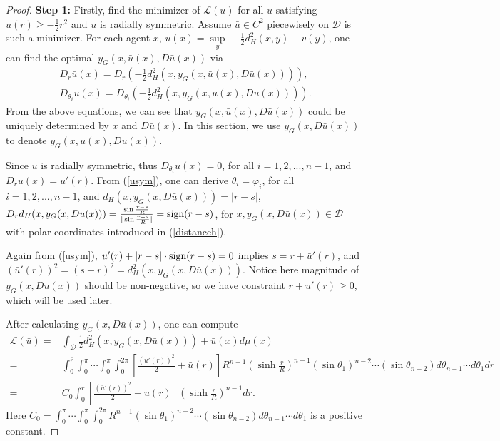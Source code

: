 \begin{proof}
	{\bf Step 1:} Firstly, find the minimizer of $\mathcal{L}(u)$ for all $u$ satisfying $u(r)\ge -\frac{1}{2}r^2$ and $u$ is radially symmetric. Assume $\bar{u} \in C^2$ piecewisely on $\mathcal{D}$ is such a minimizer. For each agent $x$, $\bar{u}(x)= \sup\limits_{y} -\frac{1}{2}d_H^2(x,y)-v(y)$, one can find the optimal $y_G(x, \bar{u}(x), D\bar{u}(x))$ via
	\begin{equation}\label{usym}
	\begin{split}
	D_r\bar{u}(x) = D_r\left(-\frac{1}{2} d_H^2(x, y_G(x, \bar{u}(x), D\bar{u}(x)))\right),\\
	D_{\theta_i}\bar{u}(x) = D_{\theta_i}\left(-\frac{1}{2} d_H^2(x, y_G(x, \bar{u}(x), D\bar{u}(x)))\right).
	\end{split}
	\end{equation}
	From the above equations, we can see that $y_G(x, \bar{u}(x), D\bar{u}(x))$ could be uniquely determined by $x$ and $D\bar{u}(x)$. In this section, we use $y_G(x, D\bar{u}(x))$ to denote $y_G(x, \bar{u}(x), D\bar{u}(x))$.
	
	Since $\bar{u}$ is radially symmetric, thus $D_{\theta_i} \bar{u}(x) =0 $, for all $i=1,2,...,n-1$, and $D_r\bar{u}(x)= \bar{u}'(r)$. From (\ref{usym}), one can derive $\theta_i = \varphi_i$, for all $i=1,2,...,n-1$, and $d_H(x, y_G(x, D\bar{u}(x))) = |r-s|$, $D_rd_H(x,y_G(x, D\bar{u}(x)))=\frac{\sin\frac{r-s}{R}}{|\sin\frac{r-s}{R}|}= \textrm{sign}(r-s) $, for $x, y_G(x, D\bar{u}(x)) \in \mathcal{D}$ with polar coordinates introduced in (\ref{distanceh}).
	
	 Again from (\ref{usym}), $\bar{u}'(r)+|r-s|\cdot \textrm{sign}(r-s)=0$ implies $s=r+\bar{u}'(r)$, and $(\bar{u}'(r))^2 =(s-r)^2 = d_H^2(x, y_G(x, D\bar{u}(x)))$. Notice here magnitude of $y_G(x, D\bar{u}(x))$ should be non-negative, so we have constraint $r+\bar{u}'(r) \ge 0$, which will be used later.
	 
	After calculating $y_G(x, D\bar{u}(x))$, one can compute
	\begin{equation*}
	\begin{split}
	\mathcal{L}(\bar{u})=& \int_{\mathcal{D}} \frac{1}{2} d_H^2(x,y_G(x, D\bar{u}(x)))+\bar{u}(x) d\mu(x)\\
	=&\int_{0}^{\bar{r}}\int_{0}^{\pi}\cdots\int_{0}^{\pi}\int_{0}^{2\pi}\left[\frac{(\bar{u}'(r))^2}{2}+\bar{u}(r)\right]R^{n-1}\left(\sinh\frac{r}{R}\right)^{n-1}(\sin \theta_1)^{n-2}\cdots (\sin\theta_{n-2}) d\theta_{n-1}\cdots d\theta_1 dr\\	
	=&C_0\int_{0}^{\bar{r}}\left[\frac{(\bar{u}'(r))^2}{2}+\bar{u}(r)\right] \left(\sinh\frac{r}{R}\right)^{n-1} dr.
	\end{split}
	\end{equation*}
	Here $C_0=\int_{0}^{\pi}\cdots\int_{0}^{\pi}\int_{0}^{2\pi}R^{n-1}(\sin \theta_1)^{n-2}\cdots (\sin\theta_{n-2}) d\theta_{n-1}\cdots d\theta_1$  is a positive constant. 
	

\end{proof}
